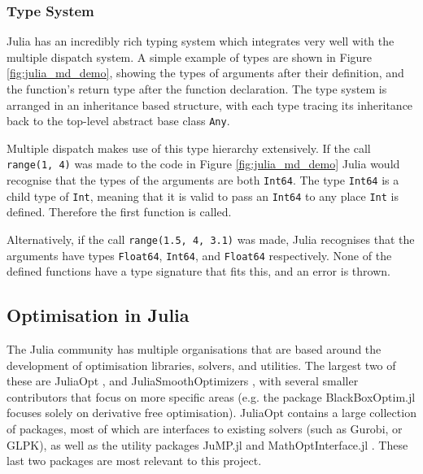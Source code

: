 %    

\subsubsection{Type System}
Julia has an incredibly rich typing system which integrates very well with the multiple dispatch system. A simple example of types are shown in Figure \ref{fig:julia_md_demo}, showing the types of arguments after their definition, and the function's return type after the function declaration. The type system is arranged in an inheritance based structure, with each type tracing its inheritance back to the top-level abstract base class \texttt{Any}.

Multiple dispatch makes use of this type hierarchy extensively. If the call \lstinline{range(1, 4)} was made to the code in Figure \ref{fig:julia_md_demo} Julia would recognise that the types of the arguments are both \texttt{Int64}. The type \texttt{Int64} is a child type of \texttt{Int}, meaning that it is valid to pass an \texttt{Int64} to any place \texttt{Int} is defined. Therefore the first function is called. 

Alternatively, if the call \lstinline{range(1.5, 4, 3.1)} was made, Julia recognises that the arguments have types \texttt{Float64}, \texttt{Int64}, and \texttt{Float64} respectively. None of the defined functions have a type signature that fits this, and an error is thrown.

\subsection{Optimisation in Julia}\label{sub_julia_opt}
The Julia community has multiple organisations that are based around the development of optimisation libraries, solvers, and utilities. The largest two of these are JuliaOpt \cite{JuliaOpt:Language}, and JuliaSmoothOptimizers \cite{JuliaSmoothOptimizers}, with several smaller contributors that focus on more specific areas (e.g. the package BlackBoxOptim.jl focuses solely on derivative free optimisation). JuliaOpt contains a large collection of packages, most of which are interfaces to existing solvers (such as Gurobi, or GLPK), as well as the utility packages JuMP.jl \cite{IntroductionJuMP}\cite{Dunning2017JuMP:Optimization} and MathOptInterface.jl \cite{ManualMathOptInterface}. These last two packages are most relevant to this project.

